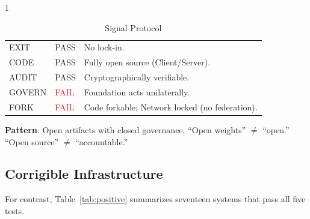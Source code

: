\documentclass{article}
\begin{document}
\begin{table}[htbp]
    \begin{subtable}{1\textwidth}
        \centering
        \caption{Signal Protocol}
        \small
        \begin{tabular}{@{}llp{8.5cm}@{}}
            \toprule
            EXIT & \textcolor{green!50!black}{PASS} & No lock-in. \\
            CODE & \textcolor{green!50!black}{PASS} & Fully open source (Client/Server). \\
            AUDIT & \textcolor{green!50!black}{PASS} & Cryptographically verifiable. \\
            GOVERN & \textcolor{red}{FAIL} & Foundation acts unilaterally. \\
            FORK & \textcolor{red}{FAIL} & Code forkable; Network locked (no federation). \\
            \bottomrule
        \end{tabular}
    \end{subtable}
\end{table}

\textbf{Pattern}: Open artifacts with closed governance. ``Open weights'' $\neq$ ``open.'' ``Open source'' $\neq$ ``accountable.''

\subsection{Corrigible Infrastructure}

For contrast, Table~\ref{tab:positive} summarizes seventeen systems that pass all five tests.
\end{document}
